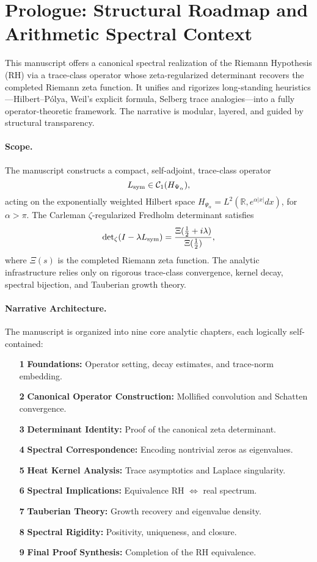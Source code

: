 \section{Prologue: Structural Roadmap and Arithmetic Spectral Context}
\label{sec:prologue}

\medskip

\noindent
This manuscript offers a canonical spectral realization of the Riemann Hypothesis (RH) via a trace-class operator whose zeta-regularized determinant recovers the completed Riemann zeta function. It unifies and rigorizes long-standing heuristics—Hilbert–Pólya, Weil’s explicit formula, Selberg trace analogies—into a fully operator-theoretic framework. The narrative is modular, layered, and guided by structural transparency.

\paragraph*{Scope.} The manuscript constructs a compact, self-adjoint, trace-class operator
\[
L_{\mathrm{sym}} \in \mathcal{C}_1(H_{\Psi_\alpha}),
\]
acting on the exponentially weighted Hilbert space \( H_{\Psi_\alpha} = L^2(\mathbb{R}, e^{\alpha|x|} dx) \), for \( \alpha > \pi \). The Carleman \(\zeta\)-regularized Fredholm determinant satisfies
\[
\det\nolimits_{\zeta}(I - \lambda L_{\mathrm{sym}}) = \frac{\Xi(\tfrac{1}{2} + i\lambda)}{\Xi(\tfrac{1}{2})},
\]
where \( \Xi(s) \) is the completed Riemann zeta function. The analytic infrastructure relies only on rigorous trace-class convergence, kernel decay, spectral bijection, and Tauberian growth theory.

\paragraph*{Narrative Architecture.} The manuscript is organized into nine core analytic chapters, each logically self-contained:

\begin{itemize}
  \item[\textbf{1}] \textbf{Foundations:} Operator setting, decay estimates, and trace-norm embedding.
  \item[\textbf{2}] \textbf{Canonical Operator Construction:} Mollified convolution and Schatten convergence.
  \item[\textbf{3}] \textbf{Determinant Identity:} Proof of the canonical zeta determinant.
  \item[\textbf{4}] \textbf{Spectral Correspondence:} Encoding nontrivial zeros as eigenvalues.
  \item[\textbf{5}] \textbf{Heat Kernel Analysis:} Trace asymptotics and Laplace singularity.
  \item[\textbf{6}] \textbf{Spectral Implications:} Equivalence RH \( \iff \) real spectrum.
  \item[\textbf{7}] \textbf{Tauberian Theory:} Growth recovery and eigenvalue density.
  \item[\textbf{8}] \textbf{Spectral Rigidity:} Positivity, uniqueness, and closure.
  \item[\textbf{9}] \textbf{Final Proof Synthesis:} Completion of the RH equivalence.
\end{itemize}

